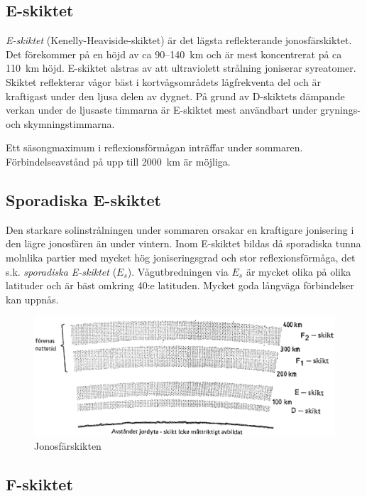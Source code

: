 \subsection{E-skiktet}

\emph{E-skiktet} (Kenelly-Heaviside-skiktet) är det lägsta reflekterande
jonosfärskiktet.
Det förekommer på en höjd av ca 90--140~km och är mest koncentrerat på
ca 110~km höjd.
E-skiktet alstras av att ultraviolett strålning joniserar syreatomer.
Skiktet reflekterar vågor bäst i kortvågsområdets lågfrekventa del och är
kraftigast under den ljusa delen av dygnet.
På grund av D-skiktets dämpande verkan under de ljusaste timmarna är E-skiktet
mest användbart under grynings- och skymningstimmarna.

Ett säsongmaximum i reflexionsförmågan inträffar under sommaren.
Förbindelseavstånd på upp till 2000~km är möjliga.

\subsection{Sporadiska E-skiktet}

Den starkare solinstrålningen under sommaren orsakar en kraftigare
jonisering i den lägre jonosfären än under vintern.
Inom E-skiktet bildas då sporadiska tunna molnlika partier med mycket hög
joniseringsgrad och stor reflexionsförmåga, det s.k. \emph{sporadiska E-skiktet}
(\(E_s\)).
Vågutbredningen via \(E_s\) är mycket olika på olika latituder och är bäst
omkring 40:e latituden.
Mycket goda långväga förbindelser kan uppnås.

\begin{figure}
  \includegraphics[width=\textwidth]{images/cropped_pdfs/bild_2_7-07.pdf}
  \caption{Jonosfärskikten}
  \label{fig:bildII7-7}
\end{figure}

\subsection{F-skiktet}

